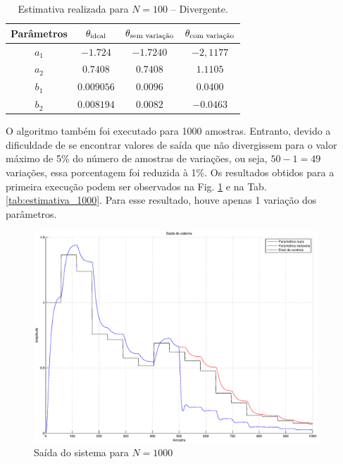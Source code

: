 \begin{table}
\centering
    \caption{Estimativa realizada para $N = 100$ -- Divergente.}
    \label{tab:estimativa_100_div}
    \vspace{0.25cm}
    \begin{tabular}{|c|c|c|c|}
        \hline
        Parâmetros & 
        $\mathbf{\theta}_{\text{ideal}}$&
        $\mathbf{\theta}_{\text{sem variação}}$&
        $\mathbf{\theta}_{\text{com variação}}$\\
        \hline
        \hline
        $a_1$ & $-1.724$   & $-1.7240$ & $-2,1177$ \\
        \hline
        $a_2$ & $0.7408$   & $0.7408$  & $1.1105$ \\
        \hline
        $b_1$ & $0.009056$ & $0.0096$  & $0.0400$ \\
        \hline
        $b_2$ & $0.008194$ & $0.0082$  & $-0.0463$ \\
        \hline
    \end{tabular}
\end{table}

O algoritmo também foi executado para 1000 amostras. Entranto, devido a
dificuldade de se encontrar valores de saída que não divergissem para o valor
máximo de 5\% do número de amostras de variações, ou seja, $50 - 1 = 49$
variações, essa porcentagem foi reduzida à 1\%. Os resultados obtidos para a
primeira execução podem ser observados na Fig. \ref{fig:saida_sist_1000} e na
Tab. \ref{tab:estimativa_1000}. Para esse resultado, houve apenas 1 variação dos
parâmetros.

\begin{figure}[htb]
\centering
    \includegraphics[width=0.95\textwidth]{imgs/questao2/saida_1000}
    \caption{Saída do sistema para $N = 1000$}
    \label{fig:saida_sist_1000}
\end{figure}

